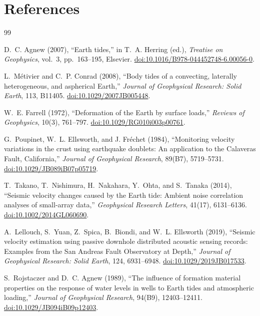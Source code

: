 \documentclass[11pt]{article}
\begin{document}
\section{References}

\begin{thebibliography}{99}

D.~C. Agnew (2007), ``Earth tides,'' in T.~A. Herring (ed.),
\emph{Treatise on Geophysics}, vol.~3, pp.~163--195, Elsevier.
\href{https://doi.org/10.1016/B978-044452748-6.00056-0}{doi:10.1016/B978-044452748-6.00056-0}.

L.~M\'etivier and C.~P. Conrad (2008), ``Body tides of a convecting,
laterally heterogeneous, and aspherical Earth,'' \emph{Journal of Geophysical
Research: Solid Earth}, 113, B11405.
\href{https://doi.org/10.1029/2007JB005448}{doi:10.1029/2007JB005448}.

W.~E. Farrell (1972), ``Deformation of the Earth by surface loads,''
\emph{Reviews of Geophysics}, 10(3), 761--797.
\href{https://doi.org/10.1029/RG010i003p00761}{doi:10.1029/RG010i003p00761}.

G.~Poupinet, W.~L. Ellsworth, and J. Fr\'echet (1984), ``Monitoring velocity
variations in the crust using earthquake doublets: An application to the
Calaveras Fault, California,'' \emph{Journal of Geophysical Research}, 89(B7),
5719--5731.
\href{https://doi.org/10.1029/JB089iB07p05719}{doi:10.1029/JB089iB07p05719}.

T.~Takano, T.~Nishimura, H.~Nakahara, Y.~Ohta, and S.~Tanaka (2014),
``Seismic velocity changes caused by the Earth tide: Ambient noise correlation
analyses of small-array data,'' \emph{Geophysical Research Letters}, 41(17),
6131--6136.
\href{https://doi.org/10.1002/2014GL060690}{doi:10.1002/2014GL060690}.

A.~Lellouch, S.~Yuan, Z.~Spica, B.~Biondi, and W.~L. Ellsworth (2019),
``Seismic velocity estimation using passive downhole distributed acoustic
sensing records: Examples from the San Andreas Fault Observatory at Depth,''
\emph{Journal of Geophysical Research: Solid Earth}, 124, 6931--6948.
\href{https://doi.org/10.1029/2019JB017533}{doi:10.1029/2019JB017533}.

S.~Rojstaczer and D.~C. Agnew (1989), ``The influence of formation material
properties on the response of water levels in wells to Earth tides and
atmospheric loading,'' \emph{Journal of Geophysical Research}, 94(B9),
12403--12411.
\href{https://doi.org/10.1029/JB094iB09p12403}{doi:10.1029/JB094iB09p12403}.

\end{thebibliography}
\end{document}

